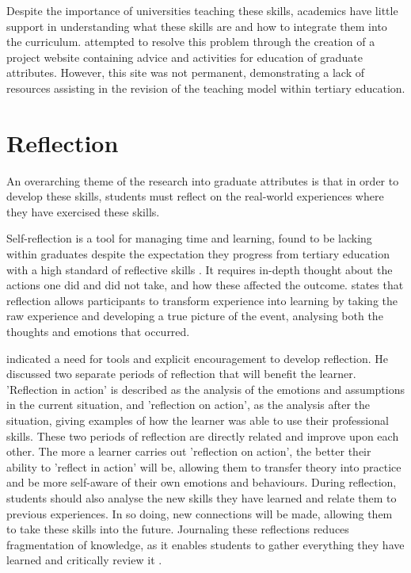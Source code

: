 \documentclass{l4proj}
\begin{document}
Despite the importance of universities teaching these skills, academics have little support in understanding what these skills are and how to integrate them into the curriculum. \citet{litchfield_contextualising_2010} attempted to resolve this problem through the creation of a project website containing advice and activities for education of graduate attributes. However, this site was not permanent, demonstrating a lack of resources assisting in the revision of the teaching model within tertiary education.


\section{Reflection} \label{backgroundReflection}

An overarching theme of the research into graduate attributes is that in order to develop these skills, students must reflect on the real-world experiences where they have exercised these skills. 

Self-reflection is a tool for managing time and learning, found to be lacking within graduates despite the expectation they progress from tertiary education with a high standard of reflective skills \citep{bruno_reflective_2018, thurner_development_2020}. It requires in-depth thought about the actions one did and did not take, and how these affected the outcome. \citet{boud_using_2001} states that reflection allows participants to transform experience into learning by taking the raw experience and developing a true picture of the event, analysing both the thoughts and emotions that occurred. 

\citet{schon_reflective_1984} indicated a need for tools and explicit encouragement to develop reflection. He discussed two separate periods of reflection that will benefit the learner. 'Reflection in action' is described as the analysis of the emotions and assumptions in the current situation, and 'reflection on action', as the analysis after the situation, giving examples of how the learner was able to use their professional skills. These two periods of reflection are directly related and improve upon each other. The more a learner carries out 'reflection on action', the better their ability to 'reflect in action' will be, allowing them to transfer theory into practice and be more self-aware of their own emotions and behaviours. During reflection, students should also analyse the new skills they have learned and relate them to previous experiences. In so doing, new connections will be made, allowing them to take these skills into the future. Journaling these reflections reduces fragmentation of knowledge, as it enables students to gather everything they have learned and critically review it \citep{oconnell_case_2011}.
\end{document}
